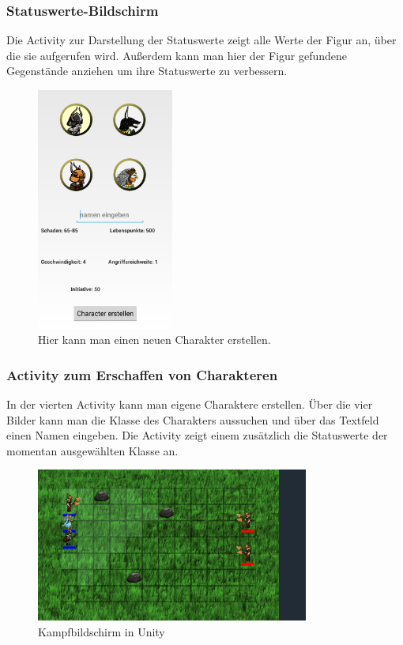 \documentclass[extern,palatino]{cgBA}
\begin{document}
\subsubsection{Statuswerte-Bildschirm}
Die Activity zur Darstellung der Statuswerte zeigt alle Werte der Figur an, über die sie aufgerufen wird. Außerdem kann man hier der Figur gefundene Gegenstände anziehen um ihre Statuswerte zu verbessern.
\newpage
\begin{figure}[H] 
		\centering
		\includegraphics[width=0.4\textwidth]{createcharscreen.png}
		\caption{Hier kann man einen neuen Charakter erstellen.}
		\label{fig:Bild5}
\end{figure} 
\subsubsection{Activity zum Erschaffen von Charakteren}
In der vierten Activity kann man eigene Charaktere erstellen. Über die vier Bilder kann man die Klasse des Charakters aussuchen und über das Textfeld einen Namen eingeben. Die Activity zeigt einem zusätzlich die Statuswerte der momentan ausgewählten Klasse an.
\newpage
\begin{figure}[H]
		\centering
		\includegraphics[width=0.8\textwidth]{fightscreen.png}
		\caption{Kampfbildschirm in Unity}
		\label{fightscreen}
\end{figure}
\end{document}
